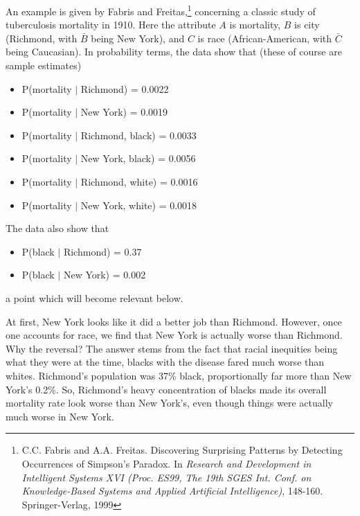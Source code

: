 An example is given by Fabris and Freitas,\footnote{C.C. Fabris and A.A.
Freitas. Discovering Surprising Patterns by Detecting Occurrences of
Simpson's Paradox.  In {\it Research and Development in Intelligent
Systems XVI (Proc. ES99, The 19th SGES Int. Conf. on Knowledge-Based
Systems  and  Applied Artificial Intelligence)}, 148-160.
Springer-Verlag, 1999 } concerning a classic study of tuberculosis
mortality in 1910.  Here the attribute $A$ is mortality, $B$ is city
(Richmond, with $\bar{B}$ being New York), and $C$ is race
(African-American, with $\bar{C}$ being Caucasian).  In probability
terms, the data show that (these of course are sample
estimates)

\begin{itemize}

\item P(mortality $|$ Richmond) = 0.0022

\item P(mortality $|$ New York) = 0.0019

\item P(mortality $|$ Richmond, black) = 0.0033

\item P(mortality $|$ New York, black) = 0.0056

\item P(mortality $|$ Richmond, white) = 0.0016

\item P(mortality $|$ New York, white) = 0.0018

\end{itemize}

\noindent The data also show that

\begin{itemize}

\item P(black $|$ Richmond) = 0.37

\item P(black $|$ New York) = 0.002

\end{itemize}

\noindent a point which will become relevant below.

At first, New York looks like it did a better job than Richmond.
However, once one accounts for race, we find that New York is actually
worse than Richmond.  Why the reversal?  The answer stems from the fact
that racial inequities being what they were at the time, blacks with the
disease fared much worse than whites.  Richmond's population was 37\%
black, proportionally far more than New York's 0.2\%.  So, Richmond's
heavy concentration of blacks made its overall mortality rate look worse
than New York's, even though things were actually much worse in New
York.

